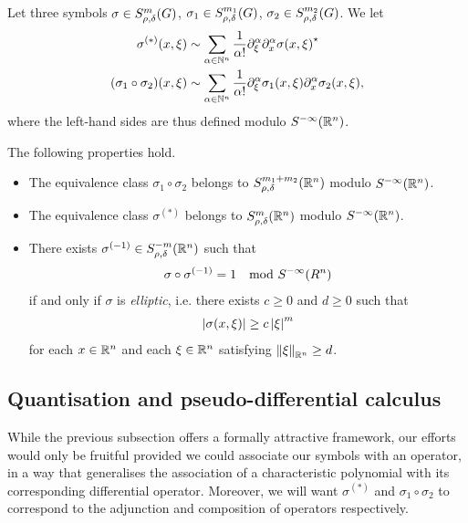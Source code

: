 \begin{theorem}
    Let three symbols
    $\sigma \in \SymbolClass m {\rho, \delta}$,
    $\sigma_1 \in \SymbolClass {m_1} {\rho, \delta}$,
    $\sigma_2 \in \SymbolClass {m_2} {\rho, \delta}$.
    We let
    \begin{align*}
        \sigma^{(*)}(x, \xi) &\sim \sum_{\alpha \in \N^n} \frac 1 {\alpha!} \iD{\xi^\alpha} \iD{x^\alpha} \adj{\sigma(x, \xi)}\\
        (\sigma_1 \circ \sigma_2)(x, \xi) &\sim \sum_{\alpha \in \N^n} \frac 1 {\alpha!} \iD{\xi^\alpha} \sigma_1(x, \xi) \iD{x^\alpha} \sigma_2(x, \xi),
    \end{align*}
    where the left-hand sides are thus defined modulo $\SmoothingSymbols [\R^n]$.

    The following properties hold.
    \begin{itemize}
        \item The equivalence class $\sigma_1 \circ \sigma_2$ belongs to $\SymbolClass [\R^n] {m_1 + m_2} {\rho, \delta}$ modulo $\SmoothingSymbols [\R^n]$.
        \item The equivalence class $\sigma^{(*)}$ belongs to $\SymbolClass [\R^n] m {\rho, \delta}$ modulo $\SmoothingSymbols [\R^n]$.
        \item
            There exists $\sigma^{(-1)} \in \SymbolClass [\R^n] {-m} {\rho, \delta}$ such that
            \begin{align*}
                \sigma \circ \sigma^{(-1)} = 1 \quad \text{mod } \SmoothingSymbols [R^n]
            \end{align*}
            if and only if $\sigma$ is \emph{elliptic},
            i.e. there exists $c \geq 0$ and $d \geq 0$ such that
            \begin{align*}
                \abs {\sigma(x, \xi)} \geq c \abs \xi^m
            \end{align*}
            for each $x \in \R^n$ and each $\xi \in \R^n$ satisfying $\norm [\R^n] \xi \geq d$.
    \end{itemize}
\end{theorem}

\subsection{Quantisation and pseudo-differential calculus}

While the previous subsection offers a formally attractive framework,
our efforts would only be fruitful
provided we could associate our symbols with an operator,
in a way that generalises the association of a characteristic polynomial with its corresponding differential operator.
Moreover, we will want $\sigma^{(*)}$ and $\sigma_1 \circ \sigma_2$ to correspond to the adjunction and composition of operators respectively.

